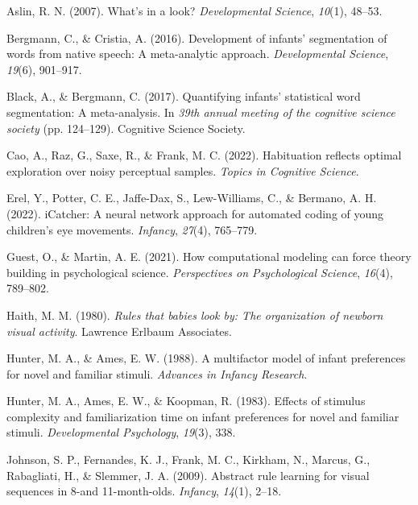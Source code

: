 \documentclass[10pt, letterpaper]{article}
\newenvironment{CSLReferences}%
  {}%
  {\par}
\begin{document}
\hypertarget{refs}{}
\begin{CSLReferences}{1}{0}
\leavevmode{}%
Aslin, R. N. (2007). What's in a look? \emph{Developmental Science},
\emph{10}(1), 48--53.

\leavevmode{}%
Bergmann, C., \& Cristia, A. (2016). Development of infants'
segmentation of words from native speech: A meta-analytic approach.
\emph{Developmental Science}, \emph{19}(6), 901--917.

\leavevmode{}%
Black, A., \& Bergmann, C. (2017). Quantifying infants' statistical word
segmentation: A meta-analysis. In \emph{39th annual meeting of the
cognitive science society} (pp. 124--129). Cognitive Science Society.

\leavevmode{}%
Cao, A., Raz, G., Saxe, R., \& Frank, M. C. (2022). Habituation reflects
optimal exploration over noisy perceptual samples. \emph{Topics in
Cognitive Science}.

\leavevmode{}%
Erel, Y., Potter, C. E., Jaffe-Dax, S., Lew-Williams, C., \& Bermano, A.
H. (2022). iCatcher: A neural network approach for automated coding of
young children's eye movements. \emph{Infancy}, \emph{27}(4), 765--779.

\leavevmode{}%
Guest, O., \& Martin, A. E. (2021). How computational modeling can force
theory building in psychological science. \emph{Perspectives on
Psychological Science}, \emph{16}(4), 789--802.

\leavevmode{}%
Haith, M. M. (1980). \emph{Rules that babies look by: The organization
of newborn visual activity}. Lawrence Erlbaum Associates.

\leavevmode{}%
Hunter, M. A., \& Ames, E. W. (1988). A multifactor model of infant
preferences for novel and familiar stimuli. \emph{Advances in Infancy
Research}.

\leavevmode{}%
Hunter, M. A., Ames, E. W., \& Koopman, R. (1983). Effects of stimulus
complexity and familiarization time on infant preferences for novel and
familiar stimuli. \emph{Developmental Psychology}, \emph{19}(3), 338.

\leavevmode{}%
Johnson, S. P., Fernandes, K. J., Frank, M. C., Kirkham, N., Marcus, G.,
Rabagliati, H., \& Slemmer, J. A. (2009). Abstract rule learning for
visual sequences in 8-and 11-month-olds. \emph{Infancy}, \emph{14}(1),
2--18.


\end{CSLReferences}
\end{document}
